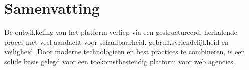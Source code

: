 
\section{Samenvatting}
\label{sec:samenvatting}

De ontwikkeling van het platform verliep via een gestructureerd, herhalende proces met veel aandacht voor schaalbaarheid, gebruiksvriendelijkheid en veiligheid. Door moderne technologieën en best practices te combineren, is een solide basis gelegd voor een toekomstbestendig platform voor web agencies.

